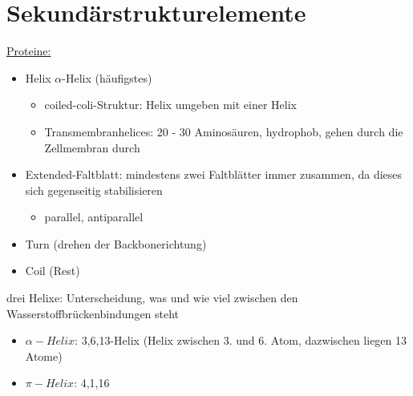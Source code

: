 \section{Sekundärstrukturelemente}
\underline{Proteine:}
\begin{itemize}
	\item Helix $\alpha$-Helix (häufigstes)
	\begin{itemize}
		\item coiled-coli-Struktur: Helix umgeben mit einer Helix
		\item Transmembranhelices: 20 - 30 Aminosäuren, hydrophob, gehen durch die Zellmembran durch
	\end{itemize}
	\item Extended-Faltblatt: mindestens zwei Faltblätter immer zusammen, da dieses sich gegenseitig stabilisieren
	\begin{itemize}
		\item parallel, antiparallel
	\end{itemize}
	\item Turn (drehen der Backbonerichtung)
	\item Coil (Rest)
\end{itemize}

drei Helixe: Unterscheidung, was und wie viel zwischen den Wasserstoffbrückenbindungen steht
\begin{itemize}
	\item $\alpha-Helix$: 3,6,13-Helix (Helix zwischen 3. und 6. Atom, dazwischen liegen 13 Atome)
	\item $\pi-Helix$: 4,1,16
\end{itemize}


